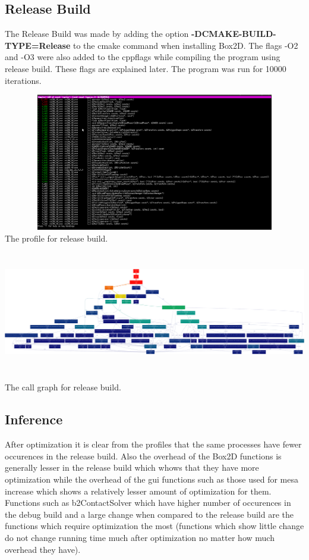 \documentclass[11pt]{article}
\begin{document}
\subsection{Release Build}
The Release Build was made by adding the option \textbf{ -DCMAKE-BUILD-TYPE=Release} to the cmake command when installing Box2D. The flags -O2 and -O3 were also added to the cppflags while compiling the program using release build. These flags are explained later. The program was run for 10000 iterations.

\begin{center}
\includegraphics[width=15cm,height = 6cm]{../images/release.png}
The profile for release build.
\\
\includegraphics[width=15cm,height = 6cm]{../images/release_call_graph.png}
The call graph for release build.
\\
\end{center}

\subsection{Inference}
After optimization it is clear from the profiles that the same processes have fewer occurences in the release build. Also the overhead of the Box2D functions is generally lesser in the release build which whows that they have more optimization while the overhead of the gui functions such as those used for mesa increase which shows a relatively lesser amount of optimization for them. Functions such as b2ContactSolver which have higher number of occurences in the debug build and a large change when compared to the release build are the functions which require optimization the most (functions which show little change do not change running time much after optimization no matter how much overhead they have).
\end{document}
